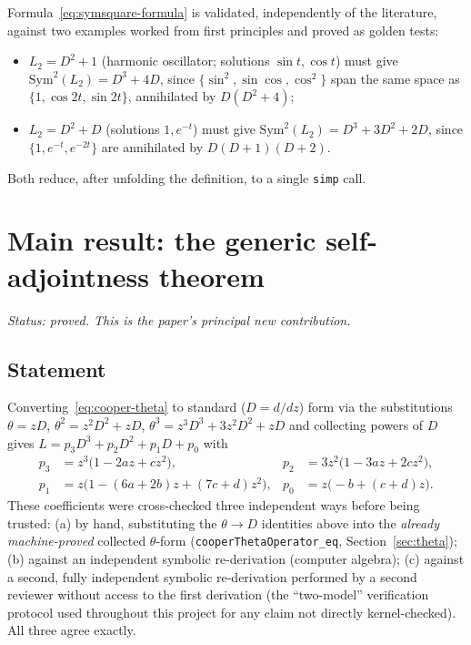 \documentclass[11pt]{article}
\begin{document}
Formula~\eqref{eq:symsquare-formula} is validated, independently of the
literature, against two examples worked from first principles and proved as
golden tests:
\begin{itemize}
  \item $L_2 = D^2+1$ (harmonic oscillator; solutions $\sin t,\cos t$) must
    give $\mathrm{Sym}^2(L_2) = D^3+4D$, since $\{\sin^2,\sin\cos,\cos^2\}$
    span the same space as $\{1,\cos 2t,\sin 2t\}$, annihilated by
    $D(D^2+4)$;
  \item $L_2 = D^2+D$ (solutions $1,e^{-t}$) must give
    $\mathrm{Sym}^2(L_2)=D^3+3D^2+2D$, since $\{1,e^{-t},e^{-2t}\}$ are
    annihilated by $D(D+1)(D+2)$.
\end{itemize}
Both reduce, after unfolding the definition, to a single \texttt{simp} call.

\section{Main result: the generic self-adjointness theorem}
\label{sec:w0}

\emph{Status: proved. This is the paper's principal new contribution.}

\subsection{Statement}

Converting~\eqref{eq:cooper-theta} to standard ($D=d/dz$) form via the
substitutions $\theta = zD$, $\theta^2 = z^2D^2+zD$,
$\theta^3=z^3D^3+3z^2D^2+zD$ and collecting powers of $D$ gives
$L = p_3 D^3 + p_2 D^2 + p_1 D + p_0$ with
\begin{align}
  p_3 &= z^3\bigl(1-2az+cz^2\bigr), &
  p_2 &= 3z^2\bigl(1-3az+2cz^2\bigr), \\
  p_1 &= z\bigl(1-(6a+2b)z+(7c+d)z^2\bigr), &
  p_0 &= z\bigl(-b+(c+d)z\bigr).
\end{align}
These coefficients were cross-checked three independent ways before being
trusted: (a) by hand, substituting the $\theta\to D$ identities above into
the \emph{already machine-proved} collected $\theta$-form
(\lstinline{cooperThetaOperator_eq}, Section~\ref{sec:theta}); (b) against an
independent symbolic re-derivation (computer algebra); (c) against a second,
fully independent symbolic re-derivation performed by a second reviewer
without access to the first derivation (the ``two-model'' verification
protocol used throughout this project for any claim not directly
kernel-checked). All three agree exactly.
\end{document}
